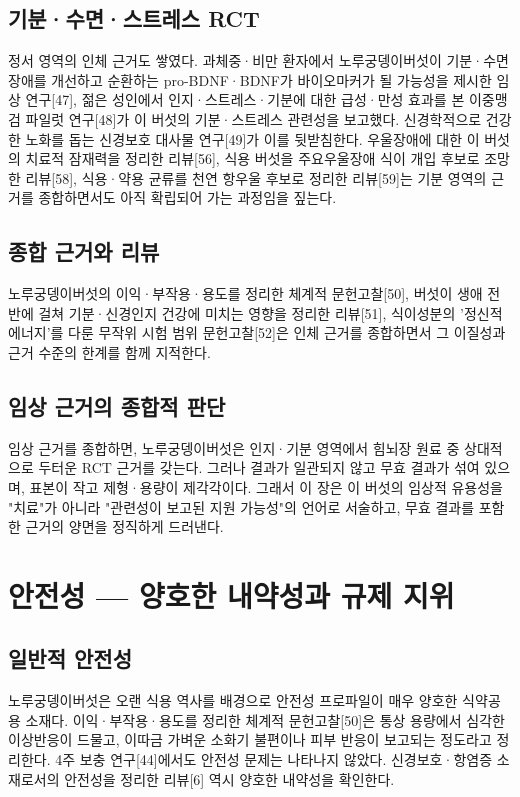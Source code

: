 \documentclass[12pt,oneside]{book}
\begin{document}
\subsection{기분·수면·스트레스 RCT}

정서 영역의 인체 근거도 쌓였다. 과체중·비만 환자에서 노루궁뎅이버섯이 기분·수면 장애를 개선하고 순환하는 pro-BDNF·BDNF가 바이오마커가 될 가능성을 제시한 임상 연구[47], 젊은 성인에서 인지·스트레스·기분에 대한 급성·만성 효과를 본 이중맹검 파일럿 연구[48]가 이 버섯의 기분·스트레스 관련성을 보고했다. 신경학적으로 건강한 노화를 돕는 신경보호 대사물 연구[49]가 이를 뒷받침한다. 우울장애에 대한 이 버섯의 치료적 잠재력을 정리한 리뷰[56], 식용 버섯을 주요우울장애 식이 개입 후보로 조망한 리뷰[58], 식용·약용 균류를 천연 항우울 후보로 정리한 리뷰[59]는 기분 영역의 근거를 종합하면서도 아직 확립되어 가는 과정임을 짚는다.

\subsection{종합 근거와 리뷰}

노루궁뎅이버섯의 이익·부작용·용도를 정리한 체계적 문헌고찰[50], 버섯이 생애 전반에 걸쳐 기분·신경인지 건강에 미치는 영향을 정리한 리뷰[51], 식이성분의 '정신적 에너지'를 다룬 무작위 시험 범위 문헌고찰[52]은 인체 근거를 종합하면서 그 이질성과 근거 수준의 한계를 함께 지적한다.

\subsection{임상 근거의 종합적 판단}

임상 근거를 종합하면, 노루궁뎅이버섯은 인지·기분 영역에서 힘뇌장 원료 중 상대적으로 두터운 RCT 근거를 갖는다. 그러나 결과가 일관되지 않고 무효 결과가 섞여 있으며, 표본이 작고 제형·용량이 제각각이다. 그래서 이 장은 이 버섯의 임상적 유용성을 "치료"가 아니라 "관련성이 보고된 지원 가능성"의 언어로 서술하고, 무효 결과를 포함한 근거의 양면을 정직하게 드러낸다.

\section{안전성 — 양호한 내약성과 규제 지위}

\subsection{일반적 안전성}

노루궁뎅이버섯은 오랜 식용 역사를 배경으로 안전성 프로파일이 매우 양호한 식약공용 소재다. 이익·부작용·용도를 정리한 체계적 문헌고찰[50]은 통상 용량에서 심각한 이상반응이 드물고, 이따금 가벼운 소화기 불편이나 피부 반응이 보고되는 정도라고 정리한다. 4주 보충 연구[44]에서도 안전성 문제는 나타나지 않았다. 신경보호·항염증 소재로서의 안전성을 정리한 리뷰[6] 역시 양호한 내약성을 확인한다.
\end{document}
